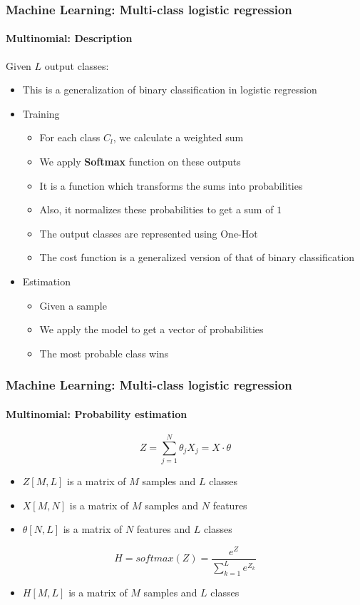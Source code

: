 \documentclass[xcolor=table]{beamer}
\begin{document}
\begin{frame}
	\frametitle{Machine Learning: Multi-class logistic regression}
	\framesubtitle{Multinomial: Description}
	
	Given $L$ output classes:
	\begin{itemize}
		\item This is a generalization of binary classification in logistic regression
		\item Training
		\begin{itemize}
			\item For each class $C_{l}$, we calculate a weighted sum
			\item We apply \textbf{Softmax} function on these outputs
			\item It is a function which transforms the sums into probabilities
			\item Also, it normalizes these probabilities to get a sum of $1$
			\item The output classes are represented using One-Hot
			\item The cost function is a generalized version of that of binary classification
		\end{itemize}
		\item Estimation
		\begin{itemize}
			\item Given a sample
			\item We apply the model to get a vector of probabilities
			\item The most probable class wins
		\end{itemize}
	\end{itemize}
	
\end{frame}

\begin{frame}
	\frametitle{Machine Learning: Multi-class logistic regression}
	\framesubtitle{Multinomial: Probability estimation}
	
	\[Z = \sum_{j=1}^{N} \theta_j X_j = X \cdot \theta\]
	\begin{itemize}
		\item $Z[M, L]$ is a matrix of $M$ samples and $L$ classes
		\item $X[M, N]$ is a matrix of $M$ samples and $N$ features
		\item $\theta[N, L]$ is a matrix of $N$ features and $L$ classes
	\end{itemize}
	
	\[H = softmax(Z) = \frac{e^{Z}}{\sum_{k=1}^{L} e^{Z_k}}\]
	
	\begin{itemize}
		\item $H[M, L]$ is a matrix of $M$ samples and $L$ classes
	\end{itemize}
	
\end{frame}
\end{document}
